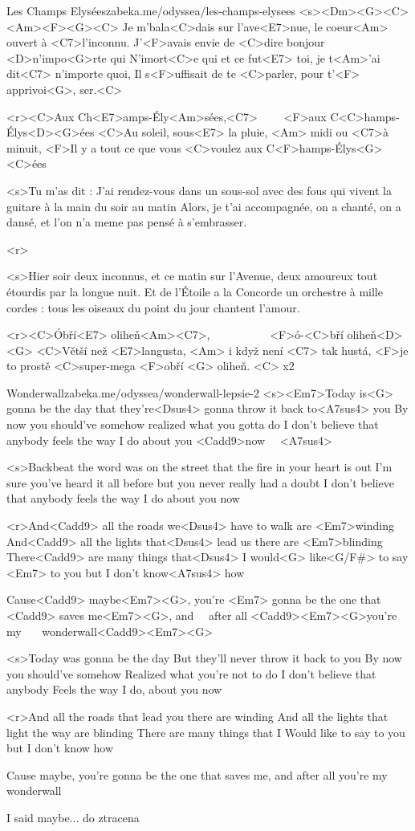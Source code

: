 \begin{song}{66}{Les Champs Elysées}{zabeka.me/odyssea/les-champs-elysees}
	<s><Dm><G><C> <Am><F><G><C>
	Je m'bala<C>dais sur l'ave<E7>nue, le coeur<Am> ouvert à <C7>l'inconnu.
	J'<F>avais envie de <C>dire bonjour <D>n'impo<G>rte qui
	N'imort<C>e qui et ce fut<E7> toi, je t<Am>'ai dit<C7> n'importe quoi,
	Il s<F>uffisait de te <C>parler, pour t'<F> apprivoi<G>, ser.<C>

	<r><C>Aux Ch<E7>amps-Ély<Am>sées,<C7> \ \ \ \ <F>aux C<C>hamps-Élys<D><G>ées
	<C>Au soleil, sous<E7> la pluie, <Am> midi ou <C7>à minuit,
	<F>Il y a tout ce que vous <C>voulez aux C<F>hamps-Élys<G><C>ées

	<s>Tu m'as dit : J'ai rendez-vous
	dans un sous-sol avec des fous
	qui vivent la guitare à la main
	du soir au matin
	Alors, je t'ai accompagnée,
	on a chanté, on a dansé,
	et l'on n'a meme pas pensé
	à s'embrasser.

	<r>

	<s>Hier soir deux inconnus,
	et ce matin sur l'Avenue,
	deux amoureux tout étourdis
	par la longue nuit.
	Et de l'Étoile a la Concorde
	un orchestre à mille cordes :
	tous les oiseaux du point du jour
	chantent l'amour.

	<r><C>Óbří<E7> oliheň<Am><C7>, \ \ \ \ \ \ \ \ \ \ <F>ó-<C>bří oliheň<D><G>
	<C>Větší než <E7>langusta, <Am> i když není <C7> tak hustá,
	<F>je to prostě <C>super-mega <F>obří <G> oliheň. <C> x2
\end{song}
\begin{song}[Oasis]{67}{Wonderwall}{zabeka.me/odyssea/wonderwall-lepsie-2}
	<s><Em7>Today is<G> gonna be the day
	that they're<Dsus4> gonna throw it back to<A7sus4> you
	By now you should've somehow
	realized what you gotta do
	I don't believe that anybody
	feels the way I do about you <Cadd9>now \ \ <Dsus4><A7sus4>

	<s>Backbeat the word was on the street
	that the fire in your heart is out
	I'm sure you've heard it all before
	but you never really had a doubt
	I don't believe that anybody
	feels the way I do about you now

	<r>And<Cadd9> all the roads we<Dsus4> have to walk are <Em7>winding
	And<Cadd9> all the lights that<Dsus4> lead us there are <Em7>blinding
	There<Cadd9> are many things that<Dsus4> I would<G> like<G/F#> to say <Em7> to you
	but I don't know<A7sus4> how

	Cause<Cadd9> maybe<Em7><G>, you're <Em7> gonna be the one that
	<Cadd9> saves me<Em7><G>, and \ \ <Em7>after all
	<Cadd9><Em7><G>you're my \ \ \ <Em7>wonderwall<Cadd9><Em7><G>

	<s>Today was gonna be the day
	But they'll never throw it back to you
	By now you should've somehow
	Realized what you're not to do
	I don't believe that anybody
	Feels the way I do, about you now

	<r>And all the roads that lead you there are winding
	And all the lights that light the way are blinding
	There are many things that I
	Would like to say to you but I don't know how

	Cause maybe, you're gonna be the one that
	saves me, and after all
	you're my wonderwall

	I said maybe... do ztracena
\end{song}
